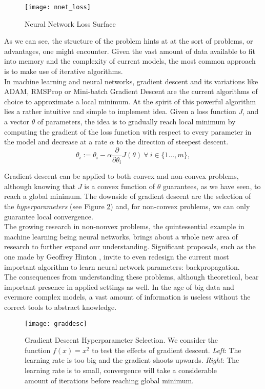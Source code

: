 \documentclass{article}
\begin{document}
	\begin{figure}[h!]
		\centering
		\texttt{[image: nnet\_loss]}
		\caption{Neural Network Loss Surface}
		\label{fig:nonconvex_loss}
	\end{figure}
	
	
	As we can see, the structure of the problem hints at at the sort of problems, or advantages, one might encounter. Given the vast amount of data available to fit into memory and the complexity of current models, the most common approach is to make use of iterative algorithms.\\
	
	In machine learning and neural networks, gradient descent and its variations like ADAM, RMSProp or Mini-batch Gradient Descent are the current algorithms of choice to approximate a local minimum. At the spirit of this powerful algorithm lies a rather intuitive and simple to implement idea. Given a loss function $J$, and a vector $\theta$ of parameters, the idea is to gradually reach local minimum by computing the gradient of the loss function with respect to every parameter in the model and decrease at a rate $\alpha$ to the direction of steepest descent.
	\begin{equation}
		\theta_i :=\theta_i - \alpha \frac{\partial}{\partial \theta_i} J(\theta) \ \forall \ i \in \{1 \ldots, m\},
	\end{equation}
	
	Gradient descent can be applied to both convex and non-convex problems, although knowing that $J$ is a convex function of $\theta$ guarantees, as we have seen, to reach a global minimum. The downside of gradient descent are the selection of the \textit{hyperparameters} (see Figure \ref{fig:graddesc}) and, for non-convex problems, we can only guarantee local convergence.\\
	
	The growing research in non-nonvex problems, the quintessential example in machine learning being neural networks, brings about a whole new area of research to further expand our understanding. Significant proposals, such as the one made by Geoffrey Hinton \cite{levine}, invite to even redesign the current most important algorithm to learn neural network parameters: backpropagation.\\
	
	The consequences from understanding these problems, although theoretical, bear important presence in applied settings as well. In the age of big data and evermore complex models, a vast amount of information is useless without the correct tools to abstract knowledge. 
	
	
	\begin{figure}
		\centering
		\texttt{[image: graddesc]}
		\caption{Gradient Descent Hyperparameter Selection. We consider the function $f(x) = x^2$ to test the effects of gradient descent. \textit{Left}: The learning rate is too big and the gradient shoots upwards. \textit{Right}: The learning rate is to small, convergence will take a considerable amount of iterations before reaching global minimum.}
		\label{fig:graddesc}
	\end{figure}
	
\nocite{*}

\end{document}
